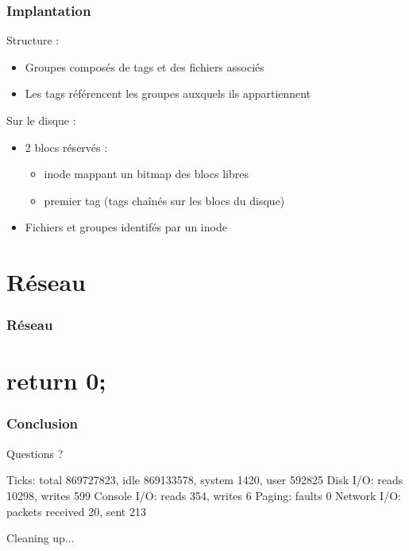 \documentclass{beamer}
\begin{document}
\begin{frame}
  \frametitle{Implantation}
  Structure :
  \begin{itemize}
  \item Groupes composés de tags et des fichiers associés
  \item Les tags référencent les groupes auxquels ils appartiennent
  \end{itemize}

  Sur le disque :
  \begin{itemize}
  \item 2 blocs réservés :
    \begin{itemize}
    \item inode mappant un bitmap des blocs libres
    \item premier tag (tags chaînés sur les blocs du disque)
    \end{itemize}
  \item Fichiers et groupes identifés par un inode
  \end{itemize}
\end{frame}

\section{Réseau}
\begin{frame}
  \frametitle{Réseau}
\end{frame}


\section*{return 0;}

\begin{frame}[fragile]
  \frametitle{Conclusion}
\begin{verbaterm}[fontsize=\scriptsize]
Questions ?

Ticks: total 869727823, idle 869133578, system 1420, user 592825
Disk I/O: reads 10298, writes 599
Console I/O: reads 354, writes 6
Paging: faults 0
Network I/O: packets received 20, sent 213

Cleaning up...
\end{verbaterm}

\end{frame}
\end{document}
